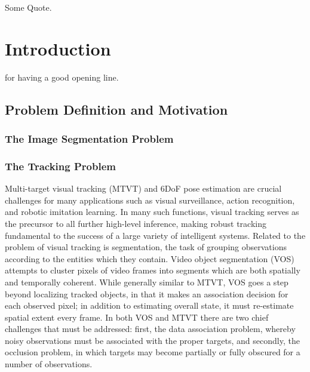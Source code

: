 \begin{savequote}[75mm]
Some Quote.
\end{savequote}


\chapter{Introduction}
 for having a good opening line.
\section{Problem Definition and Motivation}
\subsection{The Image Segmentation Problem}
\subsection{The Tracking Problem}
Multi-target visual tracking (MTVT) and 6DoF pose estimation are crucial challenges for many applications such as visual surveillance, action recognition, and robotic imitation learning. In many such functions, visual tracking serves as the precursor to all further high-level inference, making robust tracking fundamental to the success of a large variety of intelligent systems. Related to the problem of visual tracking is segmentation, the task of grouping observations according to the entities which they contain. Video object segmentation (VOS) attempts to cluster pixels of video frames into segments which are both spatially and temporally coherent. While generally similar to MTVT, VOS goes a step beyond localizing tracked objects, in that it makes an association decision for each observed pixel; in addition to estimating overall state, it must re-estimate spatial extent every frame. In both VOS and MTVT there are two chief challenges that must be addressed: first, the data association problem, whereby 
noisy observations must be associated with the proper targets, and secondly, the occlusion problem, in which targets may become partially or fully obscured for a number of observations.

